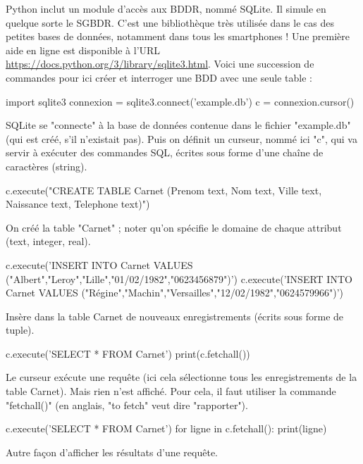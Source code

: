 \documentclass[french,11pt,twoside]{VcCours}
\begin{document}
Python inclut un module d’accès aux BDDR, nommé SQLite. Il simule en quelque sorte le SGBDR. C'est une bibliothèque très utilisée dans le cas des petites bases de données, notamment dans tous les smartphones ! Une première aide en ligne est disponible à l'URL \url{https://docs.python.org/3/library/sqlite3.html}. Voici une succession de commandes pour ici créer et interroger une BDD avec une seule table :


\begin{Python}
import sqlite3
connexion = sqlite3.connect('example.db')
c = connexion.cursor()
\end{Python}
SQLite se "connecte" à la base de données contenue dans le fichier "example.db" (qui est créé, s'il n'existait pas). Puis on définit un curseur, nommé ici "c", qui va servir à exécuter des commandes SQL, écrites sous forme d'une chaîne de caractères (string). 


\begin{Python}
c.execute("CREATE TABLE Carnet (Prenom text, 
                                Nom text, 
                                Ville text, 
                                Naissance text, 
                                Telephone text)")
\end{Python}
On créé la table "Carnet" ; noter qu'on spécifie le domaine de chaque attribut (text, integer, real).


\begin{Python}
c.execute('INSERT INTO Carnet VALUES ("Albert","Leroy","Lille","01/02/1982","0623456879")')
c.execute('INSERT INTO Carnet VALUES ("Régine","Machin","Versailles","12/02/1982","0624579966")')
\end{Python}
Insère dans la table Carnet de nouveaux enregistrements (écrits sous forme de tuple). 


\begin{Python}
c.execute('SELECT * FROM Carnet')
print(c.fetchall())
\end{Python}
Le curseur exécute une requête (ici cela sélectionne tous les enregistrements de la table Carnet). Mais rien n'est affiché. Pour cela, il faut utiliser la commande "fetchall()" (en anglais, "to fetch" veut dire "rapporter").

\begin{Python}
c.execute('SELECT * FROM Carnet')
for ligne in c.fetchall():
  print(ligne)
\end{Python}


Autre façon d'afficher les résultats d'une requête.
\end{document}
